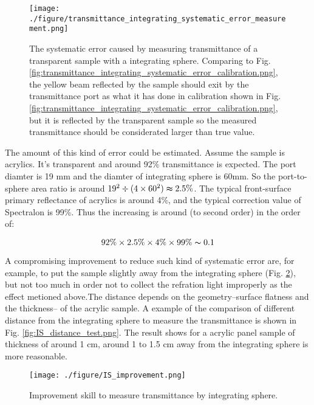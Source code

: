 \begin{figure}
    \centering
    \texttt{[image: ./figure/transmittance\_integrating\_systematic\_error\_measurement.png]}
    \caption[Transmittance measurement of the integrating sphere error attributed by transparent sample.]
{The systematic error caused by measuring transmittance of a transparent sample with a integrating sphere.
Comparing to Fig. \ref{fig:transmittance_integrating_systematic_error_calibration.png}, the yellow beam reflected by the sample
should exit by the transmittance port as what it has done in calibration shown
in Fig. \ref{fig:transmittance_integrating_systematic_error_calibration.png}, but it is reflected by the transparent sample so
the measured transmittance should be considerated larger than true value.}
    \label{fig:transmittance_integrating_systematic_error_measurement.png}
    \end{figure}

The amount of this kind of error could be estimated. Assume the sample is acrylics. It's transparent and around 92\% transmittance
is expected. The port diamter is 19 mm and the diamter of integrating sphere is 60mm.
So the port-to-sphere area ratio is around ${19^2}\div({4\times60^2})\thickapprox2.5\%$.
The typical front-surface primary reflectance of acrylics is around 4\%, and the typical correction value of Spectralon is 99\%.
Thus the increasing is around (to second order) in the order of:


\begin{equation}
\label{eq:ISError}
92\%\times2.5\%\times4\%\times99\%\thicksim0.1%
\end{equation}


A compromising improvement to reduce such kind of systematic error are, for example,
to put the sample slightly away from the integrating sphere (Fig. \ref{fig:IS_improvement.png}), but not too much in
order not to collect the refration light improperly as the effect metioned above.The distance depends on the geometry--surface flatness and
the thickness-- of the acrylic sample.  A example of the comparison of different distance from
the integrating sphere to measure the transmittance is shown in Fig. \ref{fig:IS_distance_test.png}. The result shows for a acrylic panel
sample of thickness of around 1 cm, around 1 to 1.5 cm away from the integrating sphere is more reasonable.


\begin{figure}
    \centering
    \texttt{[image: ./figure/IS\_improvement.png]}
    \caption{Improvement skill to measure transmittance by integrating sphere.}
    \label{fig:IS_improvement.png}
    \end{figure}


